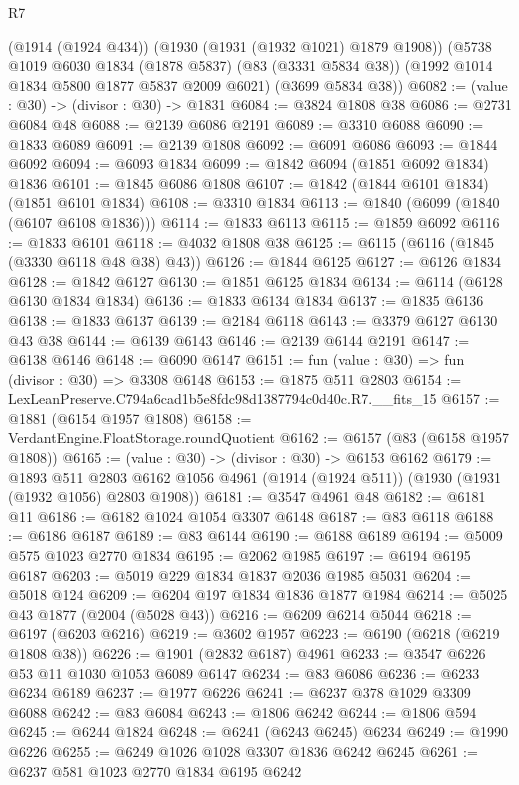 \begin{lexlean}{R7}
\begin{coremodule}
    (@1914 (@1924 @434))
    (@1930 (@1931 (@1932 @1021) @1879 @1908))
    (@5738
      @1019
      @6030
      @1834
      (@1878 @5837)
      (@83 (@3331 @5834 @38))
      (@1992 @1014 @1834 @5800 @1877 @5837 @2009 @6021)
      (@3699 @5834 @38))
@6082 := (value : @30) -> (divisor : @30) -> @1831
@6084 := @3824 @1808 @38
@6086 := @2731 @6084 @48
@6088 := @2139 @6086 @2191
@6089 := @3310 @6088
@6090 := @1833 @6089
@6091 := @2139 @1808
@6092 := @6091 @6086
@6093 := @1844 @6092
@6094 := @6093 @1834
@6099 := @1842 @6094 (@1851 @6092 @1834) @1836
@6101 := @1845 @6086 @1808
@6107 := @1842 (@1844 @6101 @1834) (@1851 @6101 @1834)
@6108 := @3310 @1834
@6113 := @1840 (@6099 (@1840 (@6107 @6108 @1836)))
@6114 := @1833 @6113
@6115 := @1859 @6092
@6116 := @1833 @6101
@6118 := @4032 @1808 @38
@6125 := @6115 (@6116 (@1845 (@3330 @6118 @48 @38) @43))
@6126 := @1844 @6125
@6127 := @6126 @1834
@6128 := @1842 @6127
@6130 := @1851 @6125 @1834
@6134 := @6114 (@6128 @6130 @1834 @1834)
@6136 := @1833 @6134 @1834
@6137 := @1835 @6136
@6138 := @1833 @6137
@6139 := @2184 @6118
@6143 := @3379 @6127 @6130 @43 @38
@6144 := @6139 @6143
@6146 := @2139 @6144 @2191
@6147 := @6138 @6146
@6148 := @6090 @6147
@6151 := fun (value : @30) => fun (divisor : @30) => @3308 @6148
@6153 := @1875 @511 @2803
@6154 := LexLeanPreserve.C794a6cad1b5e8fdc98d1387794c0d40c.R7.__fits_15
@6157 := @1881 (@6154 @1957 @1808)
@6158 := VerdantEngine.FloatStorage.roundQuotient
@6162 := @6157 (@83 (@6158 @1957 @1808))
@6165 := (value : @30) -> (divisor : @30) -> @6153 @6162
@6179 := @1893
    @511
    @2803
    @6162
    @1056
    @4961
    (@1914 (@1924 @511))
    (@1930 (@1931 (@1932 @1056) @2803 @1908))
@6181 := @3547 @4961 @48
@6182 := @6181 @11
@6186 := @6182 @1024 @1054 @3307 @6148
@6187 := @83 @6118
@6188 := @6186 @6187
@6189 := @83 @6144
@6190 := @6188 @6189
@6194 := @5009 @575 @1023 @2770 @1834
@6195 := @2062 @1985
@6197 := @6194 @6195 @6187
@6203 := @5019 @229 @1834 @1837 @2036 @1985 @5031
@6204 := @5018 @124
@6209 := @6204 @197 @1834 @1836 @1877 @1984
@6214 := @5025 @43 @1877 (@2004 (@5028 @43))
@6216 := @6209 @6214 @5044
@6218 := @6197 (@6203 @6216)
@6219 := @3602 @1957
@6223 := @6190 (@6218 (@6219 @1808 @38))
@6226 := @1901 (@2832 @6187) @4961
@6233 := @3547 @6226 @53 @11 @1030 @1053 @6089 @6147
@6234 := @83 @6086
@6236 := @6233 @6234 @6189
@6237 := @1977 @6226
@6241 := @6237 @378 @1029 @3309 @6088
@6242 := @83 @6084
@6243 := @1806 @6242
@6244 := @1806 @594
@6245 := @6244 @1824
@6248 := @6241 (@6243 @6245) @6234
@6249 := @1990 @6226
@6255 := @6249 @1026 @1028 @3307 @1836 @6242 @6245
@6261 := @6237 @581 @1023 @2770 @1834 @6195 @6242

\end{coremodule}
\end{lexlean}
